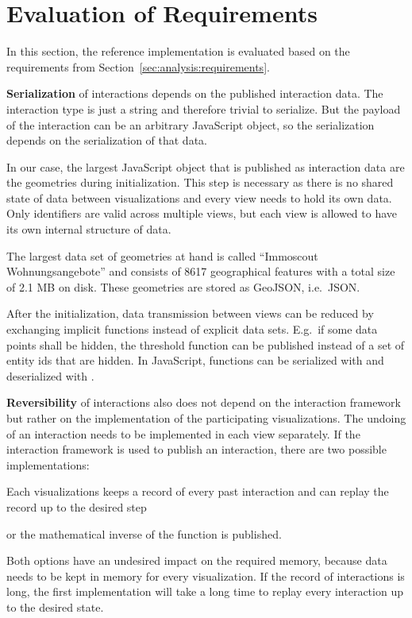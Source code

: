 \section{Evaluation of Requirements}\label{sec:evaluation:requirements}
In this section, the reference implementation is evaluated based on the requirements from Section~\ref{sec:analysis:requirements}.

\textbf{Serialization} of interactions depends on the published interaction data.
The interaction type is just a string and therefore trivial to serialize.
But the payload of the interaction can be an arbitrary JavaScript object, so the serialization depends on the serialization of that data.

In our case, the largest JavaScript object that is published as interaction data are the geometries during initialization.
This step is necessary as there is no shared state of data between visualizations and every view needs to hold its own data.
Only identifiers are valid across multiple views, but each view is allowed to have its own internal structure of data.

The largest data set of geometries at hand is called ``Immoscout Wohnungsangebote'' and consists of 8617 geographical features with a total size of 2.1 MB on disk.
These geometries are stored as GeoJSON, i.e.\ JSON.

After the initialization, data transmission between views can be reduced by exchanging implicit functions instead of explicit data sets.
E.g.\ if some data points shall be hidden, the threshold function can be published instead of a set of entity ids that are hidden.
In JavaScript, functions can be serialized with  and deserialized with .


\textbf{Reversibility} of interactions also does not depend on the interaction framework but rather on the implementation of the participating visualizations.
The undoing of an interaction needs to be implemented in each view separately.
If the interaction framework is used to publish an  interaction, there are two possible implementations:
\begin{enumerate*}[label=(\arabic*)]
  \item
    Each visualizations keeps a record of every past interaction and can replay the record up to the desired step
    \item
    or the mathematical inverse of the function is published.
\end{enumerate*}
Both options have an undesired impact on the required memory, because data needs to be kept in memory for every visualization.
If the record of interactions is long, the first implementation will take a long time to replay every interaction up to the desired state.

